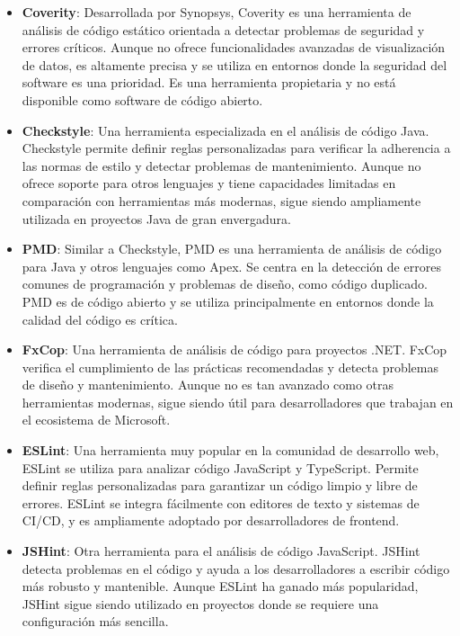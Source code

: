 \begin{itemize}
    \item \textbf{Coverity}: Desarrollada por Synopsys, Coverity es una herramienta de análisis de código estático orientada a detectar problemas de seguridad y errores críticos. Aunque no ofrece funcionalidades avanzadas de visualización de datos, es altamente precisa y se utiliza en entornos donde la seguridad del software es una prioridad. Es una herramienta propietaria y no está disponible como software de código abierto.
    \item \textbf{Checkstyle}: Una herramienta especializada en el análisis de código Java. Checkstyle permite definir reglas personalizadas para verificar la adherencia a las normas de estilo y detectar problemas de mantenimiento. Aunque no ofrece soporte para otros lenguajes y tiene capacidades limitadas en comparación con herramientas más modernas, sigue siendo ampliamente utilizada en proyectos Java de gran envergadura.
    \item \textbf{PMD}: Similar a Checkstyle, PMD es una herramienta de análisis de código para Java y otros lenguajes como Apex. Se centra en la detección de errores comunes de programación y problemas de diseño, como código duplicado. PMD es de código abierto y se utiliza principalmente en entornos donde la calidad del código es crítica.
    \item \textbf{FxCop}: Una herramienta de análisis de código para proyectos .NET. FxCop verifica el cumplimiento de las prácticas recomendadas y detecta problemas de diseño y mantenimiento. Aunque no es tan avanzado como otras herramientas modernas, sigue siendo útil para desarrolladores que trabajan en el ecosistema de Microsoft.
    \item \textbf{ESLint}: Una herramienta muy popular en la comunidad de desarrollo web, ESLint se utiliza para analizar código JavaScript y TypeScript. Permite definir reglas personalizadas para garantizar un código limpio y libre de errores. ESLint se integra fácilmente con editores de texto y sistemas de CI/CD, y es ampliamente adoptado por desarrolladores de frontend.
    \item \textbf{JSHint}: Otra herramienta para el análisis de código JavaScript. JSHint detecta problemas en el código y ayuda a los desarrolladores a escribir código más robusto y mantenible. Aunque ESLint ha ganado más popularidad, JSHint sigue siendo utilizado en proyectos donde se requiere una configuración más sencilla.
\end{itemize}

